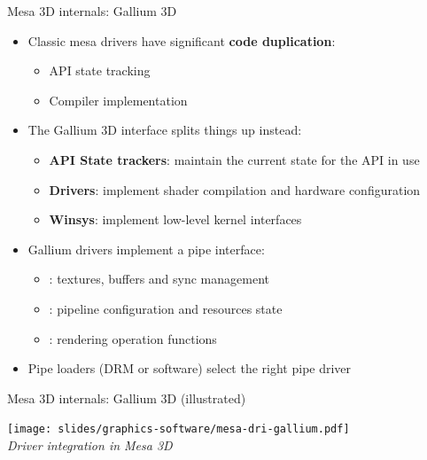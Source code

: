 \begin{frame}{Mesa 3D internals: Gallium 3D}
  \begin{itemize}
  \item Classic mesa drivers have significant \textbf{code duplication}:
    \begin{itemize}
    \item API state tracking
    \item Compiler implementation
    \end{itemize}
  \item The Gallium 3D interface splits things up instead:
    \begin{itemize}
    \item \textbf{API State trackers}: maintain the current state for the API in use
    \item \textbf{Drivers}: implement shader compilation and hardware configuration
    \item \textbf{Winsys}: implement low-level kernel interfaces
    \end{itemize}
  \item Gallium drivers implement a pipe interface:
    \begin{itemize}
    \item {}: textures, buffers and sync management
    \item {}: pipeline configuration and resources state
    \item {}: rendering operation functions
    \end{itemize}
  \item Pipe loaders (DRM or software) select the right pipe driver
  \end{itemize}
\end{frame}

\begin{frame}{Mesa 3D internals: Gallium 3D (illustrated)}
  \begin{center}
  \texttt{[image: slides/graphics-software/mesa-dri-gallium.pdf]}\\
  \textit{\small Driver integration in Mesa 3D}
  \end{center}
\end{frame}

